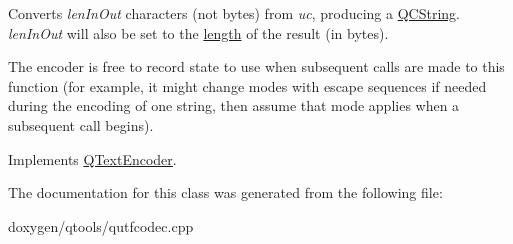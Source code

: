 Converts {\itshape len\+In\+Out} characters (not bytes) from {\itshape uc}, producing a \mbox{\hyperlink{class_q_c_string}{Q\+C\+String}}. {\itshape len\+In\+Out} will also be set to the \mbox{\hyperlink{class_q_c_string_ac52596733e9110b778019946d73fb268}{length}} of the result (in bytes).

The encoder is free to record state to use when subsequent calls are made to this function (for example, it might change modes with escape sequences if needed during the encoding of one string, then assume that mode applies when a subsequent call begins). 

Implements \mbox{\hyperlink{class_q_text_encoder_a3b199427ee9b7f862fe65811165dbbfa}{Q\+Text\+Encoder}}.



The documentation for this class was generated from the following file\+:\begin{DoxyCompactItemize}
\item 
doxygen/qtools/qutfcodec.\+cpp\end{DoxyCompactItemize}
